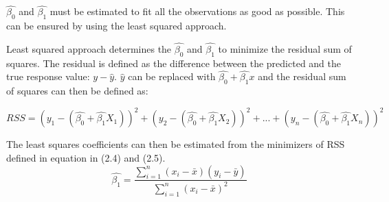



$\hat{\beta_0}$ and  $\hat{\beta_1}$ must be estimated to fit all the observations as good as possible. This can be ensured by using the least squared approach.


Least squared approach determines the $\hat{\beta_0}$ and  $\hat{\beta_1}$ to minimize the residual sum of squares.
The residual is defined as the difference between the predicted and the true response value: $y-\hat{y}$. $\hat{y}$ can be replaced with $\hat{\beta_0} + \hat{\beta_1}x$ and the residual sum of squares can then be defined as:

\begin{equation}
RSS = (y_1 - (\hat{\beta_0} + \hat{\beta_1}X_1))^2 + (y_2 - (\hat{\beta_0} + \hat{\beta_1}X_2))^2 + ... + (y_n - (\hat{\beta_0} + \hat{\beta_1}X_n))^2
\end{equation}


The least squares coefficients can then be estimated from the minimizers of RSS defined in equation in (2.4) and (2.5).
\begin{equation}
\hat{\beta_1} = \dfrac{\sum\limits_{i=1}^n(x_i - \bar{x})(y_i - \bar{y})}{\sum\limits_{i=1}^n(x_i - \bar{x})^2}
\end{equation}

